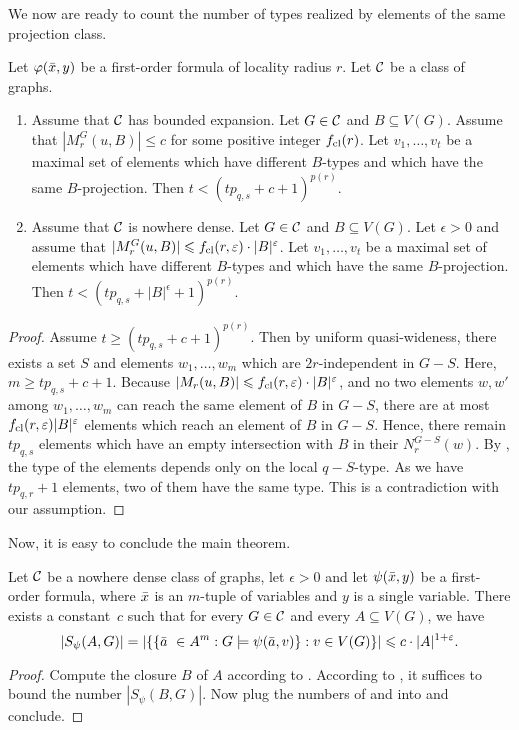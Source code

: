 We now are ready to count the number of types realized by elements
of the same projection class. 

\begin{lemma}\label{lem:num-types-same-class}
Let $\varphi(\bar{x},y)$ be a first-order formula of locality radius $r$. 
Let $\mathcal{C}$ be a class of graphs. 
\begin{enumerate}
\item Assume that $\mathcal{C}$ has bounded expansion. Let 
$G\in \mathcal{C}$ and $B\subseteq V(G)$. Assume that 
$|M_r^G(u,B)|\leq c$ for some positive integer
$f_{\mathrm{cl}}(r)$. Let $v_1,\ldots, v_t$ be a maximal set
of elements which have different $B$-types and which
have the same $B$-projection. Then $t< (tp_{q,s}+c+1)^{p(r)}$. 

\item Assume that $\mathcal{C}$ is nowhere dense. Let 
$G\in \mathcal{C}$ and $B\subseteq V(G)$. Let $\epsilon>0$ 
and assume that 
$|M_r^G(u,B)|\leqslant f_{\mathrm{cl}}(r,\varepsilon)\cdot |B|^\varepsilon$. 
Let $v_1,\ldots, v_t$ be a maximal set
of elements which have different $B$-types and which
have the same $B$-projection. Then $t< (tp_{q,s}+|B|^\epsilon+1)^{p(r)}$. 
\end{enumerate}
\end{lemma}
\begin{proof}
Assume $t\geq (tp_{q,s}+c+1)^{p(r)}$. Then by uniform
quasi-wideness, there exists a set $S$ and elements 
$w_1,\ldots, w_m$ which are $2r$-independent in $G-S$. 
Here, $m\geq tp_{q,s}+c+1$. Because $|M_r(u,B)|\leqslant f_{\mathrm{cl}}(r,\varepsilon)\cdot |B|^{\varepsilon}$, and no two elements $w,w'$ among
$w_1,\ldots, w_m$ can reach the same element of $B$
in $G-S$, there are at most $f_{\mathrm{cl}}(r,\varepsilon)|B|^\varepsilon$
elements which reach an element of $B$ in $G-S$. 
Hence, there remain $tp_{q,s}$ elements which have
an empty intersection with $B$ in their $N_r^{G-S}(w)$. 
By , 
the type of the elements depends only on the local $q-S$-type. 
As we have $tp_{q,r}+1$ elements, two of them have the
same type. This is a contradiction with our assumption. 
\end{proof}

Now, it is easy to conclude the main theorem. 

\begin{theorem}\label{thm:vc-density}
Let $\mathcal{C}$ be a nowhere dense class of graphs, 
let $\epsilon>0$ and let $\psi(\bar{x},y)$ be a first-order formula, where 
$\bar{x}$ is an $m$-tuple of variables and $y$ is a single variable. 
There exists a constant~$c$ such that for every $G\in \mathcal{C}$ 
and every
$A\subseteq V(G)$, we have 
\[|S_\psi(A,G)|=|\{\{\bar{a}\ \in A^m : G\models\psi(\bar{a},v)\} : v\in V(G)\}|\leqslant c\cdot |A|^{1+\varepsilon}.\]
\end{theorem}
\begin{proof}
Compute the closure $B$ of $A$ according to . 
According to , it suffices to bound the
number $|S_\psi(B,G)|$. Now plug the numbers of 
 and  
into  and conclude. 
\end{proof}